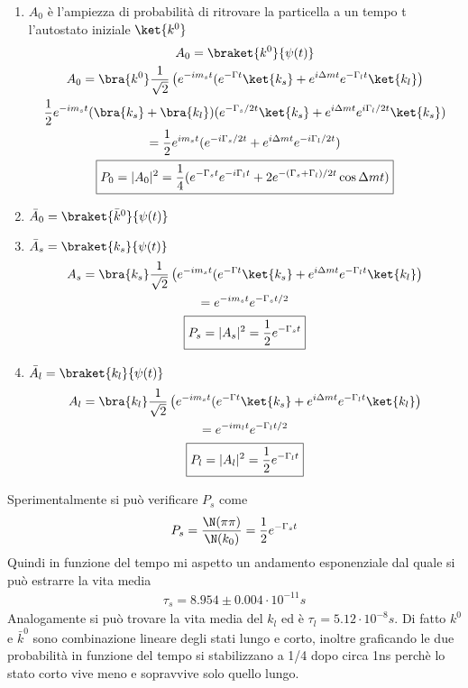 \documentclass[12pt]{book}
\begin{document}
\begin{enumerate}
	\item $A_0$ è l'ampiezza di probabilità di ritrovare la particella a un tempo t l'autostato iniziale $\ket{k^0}$
	\begin{gather}
		A_0= \braket{k^0}{\psi(t)}\\
			A_0 = \bra{k^0} \frac{1}{\sqrt{2}}\left( e^{-im_st} (e^{-\Gamma t} \ket{k_s} + e^{i\Delta mt} e^{-\Gamma_l t}\ket{k_l} \right)\\
			\frac{1}{2} e^{-im_st} ( \bra{k_s}+ \bra{k_l}) ( e^{- \Gamma_s/2 t} \ket{k_s} + e^{i\Delta mt}e^{i \Gamma_l/2 t } \ket{k_s} )\\
			= \frac{1}{2} e^{im_st} ( e^{-i \Gamma_s/2t} + e^{i \Delta m t} e^{-i \Gamma_l /2 t})\\
			\boxed{P_0=|A_0|^2 = \frac{1}{4} ( e^{-\Gamma_st} e^{-i\Gamma_l t} + 2 e^{-(\Gamma_s + \Gamma_l)/2t} \cos \Delta m t)}
	\end{gather}
	\item $\bar A_0 = \braket{\bar k^0}{\psi(t)}$
	
	\item $\bar A_s = \braket{k_s}{\psi(t)}$
	\begin{gather}
	A_s = 	\bra{k_s}\frac{1}{\sqrt{2}} \left( e^{-im_st} (e^{-\Gamma t} \ket{k_s} + e^{i\Delta mt} e^{-\Gamma_l t}\ket{k_l} \right)\\
	=e^{-im_st} e^{-\Gamma_s t/2}\\
	\boxed{P_s= |A_s|^2 =\frac{1}{2} e^{-\Gamma_st}}
	\end{gather}

	\item $\bar A_l = \braket{k_l}{\psi(t)}$
	\begin{gather}
		A_l = \bra{k_l}\frac{1}{\sqrt{2}} \left( e^{-im_st} (e^{-\Gamma t} \ket{k_s} + e^{i\Delta mt} e^{-\Gamma_l t}\ket{k_l} \right)\\
		=e^{-im_lt} e^{-\Gamma_l t/2}\\
		\boxed{P_l=|A_l|^2 =\frac{1}{2} e^{-\Gamma_lt}}
	\end{gather}
\end{enumerate}
Sperimentalmente si può verificare $P_s$ come
\begin{gather}
	P_s = \frac{\N (\pi \pi)}{\N (k_0)}= \frac{1}{2} e^{-\Gamma_st}
\end{gather}
Quindi in funzione del tempo mi aspetto un andamento esponenziale dal quale si può estrarre la vita media
\begin{gather}
	\tau_s = 8.954 \pm 0.004 \cdot 10^{-11}s
\end{gather}
Analogamente si può trovare la vita media del $k_l$ ed è $\tau_l = 5.12 \cdot 10^{-8}s$. Di fatto $k^0$ e $\bar k^0$ sono combinazione lineare degli stati lungo e corto, inoltre graficando le due probabilità in funzione del tempo si stabilizzano a 1/4 dopo circa 1ns perchè lo stato corto vive meno e sopravvive solo quello lungo.
\end{document}
